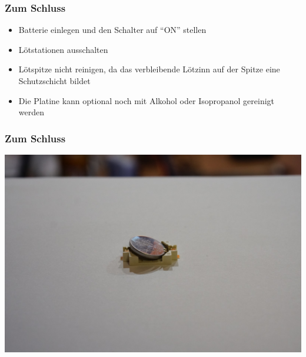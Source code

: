 \documentclass[10pt]{beamer}
\begin{document}
	\begin{frame}
	\frametitle{Zum Schluss}
	\begin{itemize} 
		\item{Batterie einlegen und den Schalter auf ``ON'' stellen}
		\item{Lötstationen ausschalten}
		\item{Lötspitze nicht reinigen, da das verbleibende Lötzinn auf der Spitze eine Schutzschicht bildet}
		\item{Die Platine kann optional noch mit Alkohol oder Isopropanol gereinigt werden}
	\end{itemize}
	\end{frame}

	\begin{frame}
		\frametitle{Zum Schluss}
		\includegraphics[width=\linewidth]{images/badge18/battHolderWithBattery.JPG}
	\end{frame}
\end{document}
